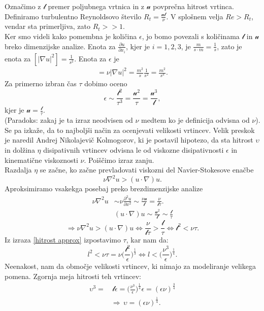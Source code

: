 \documentclass[mat2, tisk]{fmfdelo}
\begin{document}
Označimo z $\mathscr{l}$ premer poljubnega vrtnica in z $\mathscr{u}$ povprečna hitrost vrtinca.
Definiramo turbulentno Reynoldsovo število $R_t = \frac{\mathscr{u}\mathscr{l}}{\nu}$. 
V splošnem velja $Re > R_t$, vendar sta primerljiva, zato $R_t >> 1$. \\
Ker smo videli kako pomembna je količina $\epsilon$, jo bomo povezali s količinama 
$\mathscr{l}$ in $\mathscr{u}$ breko dimenzijske analize. Enota za $\frac{\partial u}{\partial x_i}$,
kjer je $i=1,2,3$, je $\frac{m}{s\cdot m} = \frac{1}{s}$, zato je enota za $[|\nabla u|^2] = \frac{1}{s^2}$.
Enota za $\epsilon$ je 
\begin{align*}
[\epsilon] = \nu |\nabla u|^2 = \frac{m^2}{s} \frac{1}{s^2} = \frac{m^2}{s^3}.
\end{align*}
Za primerno izbran čas $\tau$ dobimo oceno
\begin{equation}
\label{hitrost approx}
\epsilon \sim \frac{\mathscr{l}^2}{\tau^3} = \frac{\mathscr{u}^2}{\tau} = \frac{\mathscr{u^3}}{\mathscr{l}},
\end{equation}
kjer je $\mathscr{u} = \frac{\mathscr{l}}{\tau}$.\\
(Paradoks: zakaj je ta izraz neodvisen od $\nu$ medtem ko je definicija odvisna od $\nu$).\\
Se pa izkaže, da to najboljši način za ocenjevati velikosti vrtincev. Velik preskok je 
naredil Andrej Nikolajevič Kolmogorov, ki je postavil hipotezo, da sta hitrost $\upsilon$ 
in dolžina $\eta$ disipativnih vrtincev odvisna le od viskozne disipativnosti $\epsilon$ 
in kinematične viskoznosti $\nu$. Poiščimo izraz zanju.\\
Razdalja $\eta$  se začne, ko začne prevladovati viskozni del Navier-Stokesove enačbe 
$$
\nu \nabla^2 u > (u\cdot \nabla)u.
$$
Aproksimiramo vsakekga posebaj preko brezdimenzijske analize 
\begin{align*}
\nu \nabla^2 u &\sim \nu \frac{\partial^2 u}{\partial x^2} \sim \frac{\nu \mathscr{u}}{\mathscr{l}} = \frac{\nu}{\mathscr{l}\tau}. \\[2mm]
&(u\cdot \nabla)u \sim \frac{\mathscr{u}^2}{\mathscr{l}} \sim \frac{\mathscr{l}}{\tau}
\end{align*}
$$                                                                                                                                                                                                                
\Longrightarrow \nu \nabla^2 u > (u\cdot \nabla)u \iff \frac{\nu}{\mathscr{l}\tau} > \frac{\mathscr{l}}{\tau} \iff \mathscr{l}^2 < \nu \tau.
$$
Iz izraza \ref{hitrost approx} izpostavimo $\tau$, kar nam da:
$$
l^2 < \nu \tau = \nu \Big(\frac{\mathscr{l}^2}{\epsilon} \Big)^\frac{1}{3} \iff l < \Big(\frac{\nu^3}{\epsilon} \Big)^\frac{1}{4}.
$$
Neenakost, nam da območje velikosti vrtincev, ki nimajo za modeliranje velikega pomena. 
Zgornja meja hitrosti teh vrtincev:
\begin{align*}
\upsilon^3 =& \,\mathscr{l}\epsilon = \Big(\frac{\nu^3}{\epsilon}\Big)^\frac{1}{4} \epsilon = (\epsilon \nu)^\frac{3}{4} \\
&\Longrightarrow\, \upsilon = (\epsilon \nu)^\frac{1}{4}.
\end{align*}
\end{document}
